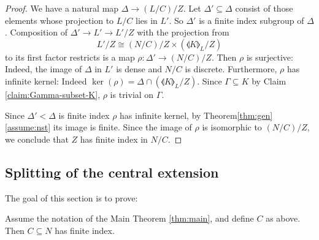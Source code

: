 \begin{proof} We have a natural map $\Delta\to (L/C)/Z$. Let $\Delta'\subseteq \Delta$ consist of those elements whose projection to $L/C$ lies in $L'$. So $\Delta'$ is a finite index subgroup of $\Delta$. Composition of $\Delta'\to L'\to L'/Z$ with the projection from
\[
L'/Z\cong (N/C)/Z \times (\llangle K\rrangle_L / Z)
\]
to its first factor restricts is a map $\rho:\Delta'\to (N/C)/Z$. Then $\rho$ is surjective: Indeed, the image of $\Delta$ in $L'$ is dense and $N/C$ is discrete. Furthermore, $\rho$ has infinite kernel: Indeed $\ker(\rho)=\Delta\cap (\llangle K\rrangle_L/Z)$. Since $\Gamma\subseteq K$ by Claim \ref{claim:Gamma-subset-K}, $\rho$ is trivial on $\Gamma$.

Since $\Delta'<\Delta$ is finite index $\rho$ has infinite kernel, by Theorem\ref{thm:gen}\eqref{assume:nst} its image is finite. Since the image of $\rho$ is isomorphic to $(N/C)/Z$, we conclude that $Z$ has finite index in $N/C$.\end{proof}

\subsection{Splitting of the central extension} \label{sec:abquot}
The goal of this section is to prove:
\begin{lemma} \label{lemma:c-fi} Assume the notation of the Main Theorem \ref{thm:main}, and define $C$ as above. Then $C\subseteq N$ has finite index.\end{lemma}

